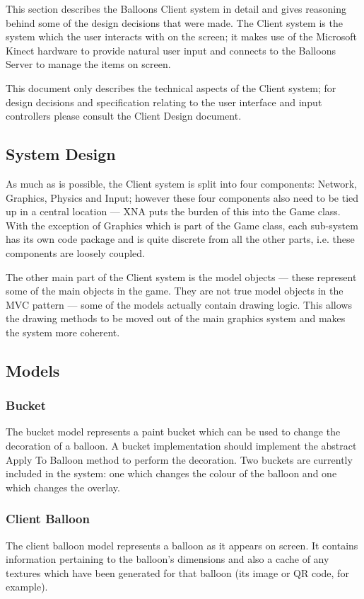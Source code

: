 This section describes the Balloons Client system in detail and gives
reasoning behind some of the design decisions that were made. The Client system
is the system which the user interacts with on the screen; it makes use of the
Microsoft Kinect hardware to provide natural user input and connects to the 
Balloons Server to manage the items on screen. 

This document only describes the technical aspects of the Client system; for 
design decisions and specification relating to the user interface and input 
controllers please consult the Client Design document.

\subsection{System Design}
As much as is possible, the Client system is split into four components: 
Network, Graphics, Physics and Input; however these four components also need 
to be tied up in a central location --- XNA puts the burden of this into the Game
class. With the exception of Graphics which is part of the Game class, each
sub-system has its own code package and is quite discrete from all the other 
parts, i.e. these components are loosely coupled.

The other main part of the Client system is the model objects --- these represent
some of the main objects in the game. They are not true model objects in the
MVC pattern --- some of the models actually contain drawing logic. This allows
the drawing methods to be moved out of the main graphics system and makes the
system more coherent.

\subsection{Models}
\subsubsection{Bucket}
The bucket model represents a paint bucket which can be used to change the 
decoration of a balloon. A bucket implementation should implement the abstract
Apply To Balloon method to perform the decoration. Two buckets are currently
included in the system: one which changes the colour of the balloon and one 
which changes the overlay. 

\subsubsection{Client Balloon}
The client balloon model represents a balloon as it appears on screen. It 
contains information pertaining to the balloon's dimensions and also a cache of
any textures which have been generated for that balloon (its image or QR code, 
for example). 

